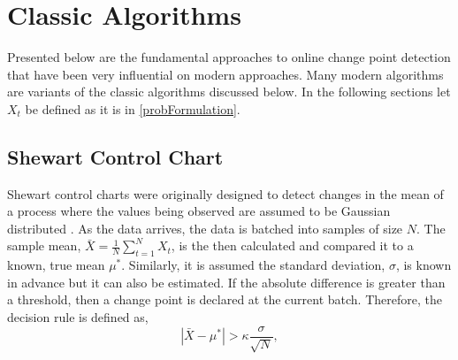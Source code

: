 \iffalse
Other standard classifier metrics can also used for comparing $\hat{t}$ and $t^*$. This includes the  F1-Score that is based on a classifier's precision and recall:
\begin{equation}
F_1(\hat{t}, t^*) = 2 * \frac{\text{precision*recall}}{\text{precision + recall}}
\end{equation}

F1-Score is defined as the harmonic mean of precision and recall. Precision is defined as the ratio of true positives (TP) to the
number of true positives (TP) and false positives (FP) and recall is defined as the ratio the number of true positives to the
number of true positives plus the number of false negatives. F1-Score is best when F1 = 1 (perfect precision and recall) and reaches its worst value at F1 = 0. Depending on the context, any other classifier evaluation tools such as the Receiver Operating Characteristics Curve and the Precision Recall Curve may be used as well.
\fi

\section{Classic Algorithms}
\label{classic_algo}
Presented below are the fundamental approaches to online change point detection that have been very influential on modern approaches. Many modern algorithms are variants of the classic algorithms discussed below. In the following sections let $X_t$ be defined as it is in \ref{probFormulation}.

\subsection{Shewart Control Chart}
Shewart control charts were originally designed to detect changes in the mean of a process where the values being observed are assumed to be Gaussian distributed \cite{shewhart1931economic}. As the data arrives, the data is batched into samples of size $N$. The sample mean, $\bar{X}=\frac{1}{N} \sum_{t=1}^N X_t$, is the then calculated and compared it to a known, true mean $\mu^*$.  Similarly, it is assumed the standard deviation, $\sigma$, is known in advance but it can also be estimated. If the absolute difference is greater than a threshold, then a change point is declared at the current batch. Therefore, the decision rule is defined as,
\begin{equation}
|\bar{X}-\mu^*| > \kappa \frac{\sigma}{\sqrt{N}},
\end{equation}

